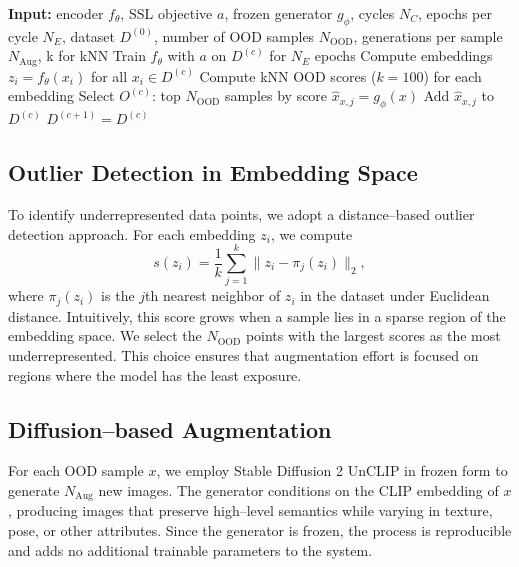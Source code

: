 \documentclass{article} %
\begin{document}
\begin{algorithm}[t]
\caption{BRIDGE: Cyclic Self–Supervised Training with Dataset Repair}
\label{alg:bridge}
\begin{algorithmic}[1]
\STATE \textbf{Input:} encoder $f_{\theta}$, SSL objective $a$, frozen generator $g_{\phi}$, cycles $N_C$, epochs per cycle $N_E$, dataset $D^{(0)}$, number of OOD samples $N_{\text{OOD}}$, generations per sample $N_{\text{Aug}}$, k for kNN
    \STATE Train $f_{\theta}$ with $a$ on $D^{(c)}$ for $N_E$ epochs
    \STATE Compute embeddings $z_i=f_{\theta}(x_i)$ for all $x_i \in D^{(c)}$
    \STATE Compute kNN OOD scores ($k=100$) for each embedding
    \STATE Select $O^{(c)}$: top $N_{\text{OOD}}$ samples by score
            \STATE $\hat{x}_{x,j} = g_{\phi}(x)$
            \STATE Add $\hat{x}_{x,j}$ to $D^{(c)}$
        \ENDFOR
    \ENDFOR
    \STATE $D^{(c+1)} = D^{(c)}$
\ENDFOR
\end{algorithmic}
\end{algorithm}

\subsection{Outlier Detection in Embedding Space}

To identify underrepresented data points, we adopt a distance–based outlier detection approach. For each embedding $z_i$, we compute
\[
s(z_i) = \frac{1}{k} \sum_{j=1}^k \lVert z_i - \pi_j(z_i) \rVert_2,
\]
where $\pi_j(z_i)$ is the $j$th nearest neighbor of $z_i$ in the dataset under Euclidean distance. Intuitively, this score grows when a sample lies in a sparse region of the embedding space. We select the $N_{\text{OOD}}$ points with the largest scores as the most underrepresented. This choice ensures that augmentation effort is focused on regions where the model has the least exposure.

\subsection{Diffusion–based Augmentation}

For each OOD sample $x$, we employ Stable Diffusion 2 UnCLIP in frozen form to generate $N_{\text{Aug}}$ new images. The generator conditions on the CLIP embedding of $x$, producing images that preserve high–level semantics while varying in texture, pose, or other attributes. Since the generator is frozen, the process is reproducible and adds no additional trainable parameters to the system.
\end{document}
